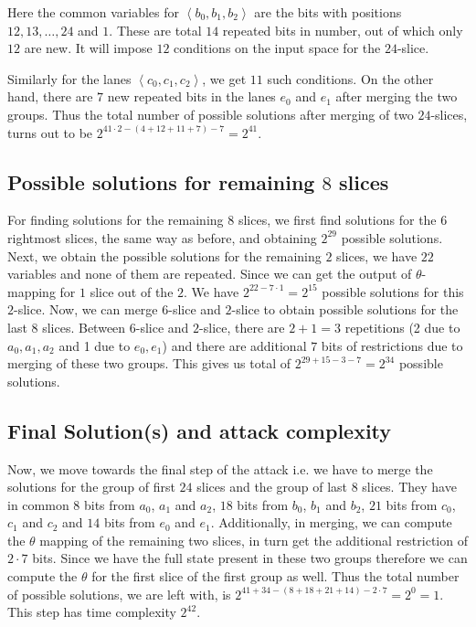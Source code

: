 Here the common variables for $\left< b_0, b_1, b_2\right>$ are the bits with positions
$12, 13,\ldots, 24$ and $1$. These are total $14$ repeated bits in number, out of which only $12$ are new. It will impose $12$ conditions on the input space for the $24$-slice.

Similarly for the lanes $\left< c_0, c_1,c_2 \right>$, we get $11$ such conditions.
On the other hand, there are $7$ new repeated bits in the lanes $e_0$ and $e_1$ after merging the two groups. Thus the total number of possible solutions after merging of two $24$-slices, turns out to be $2^{41\cdot 2 - (4 + 12 + 11 + 7) - 7 } = 2^{41}$.

\subsection{Possible solutions for remaining $8$ slices} 
For finding solutions for the remaining $8$ slices, we first find solutions for the $6$ rightmost slices, the same way as before, and obtaining $2^{29}$ possible solutions. 
Next, we obtain the possible solutions for the remaining $2$ slices, we have $22$ variables and none of them are repeated. Since we can get the output of $\theta$-mapping for $1$ slice out of the $2$. We have  $2^{22 - 7\cdot 1} = 2^{15}$ possible solutions for this $2$-slice.
Now, we can merge $6$-slice and $2$-slice to obtain possible solutions for the last $8$ slices. Between $6$-slice and $2$-slice, there are $2 + 1 = 3$ repetitions (2 due to $a_0,a_1,a_2$ and 1 due to $e_0, e_1$) and there are additional $7$ bits of restrictions due to merging of these two groups. This gives us total of $2^{29 + 15 - 3 -7} = 2^{34}$ possible solutions.

\subsection{Final Solution(s) and attack complexity}
Now, we move towards the final step of the attack i.e. we have to merge the solutions for the group of first $24$ slices and the group of last $8$ slices. They have in common $8$ bits from $a_0$, $a_1$ and  $a_2$, $18$ bits from $b_0$, $b_1$ and $b_2$, $21$ bits from $c_0$, $c_1$ and $c_2$ and $14$ bits from $e_0$ and $e_1$. Additionally, in merging, we can compute the $\theta$ mapping of the remaining two slices, in turn get the additional restriction of $2\cdot 7$ bits. Since we have the full state present in these two groups therefore we can compute the $\theta$ for the first slice of the first group as well. Thus the total number of possible solutions, we are left with, is $2^{41 + 34 - (8 + 18 + 21 + 14) - 2 \cdot 7} = 2^{0} = 1$. This step has time complexity $ 2^{42}$.

